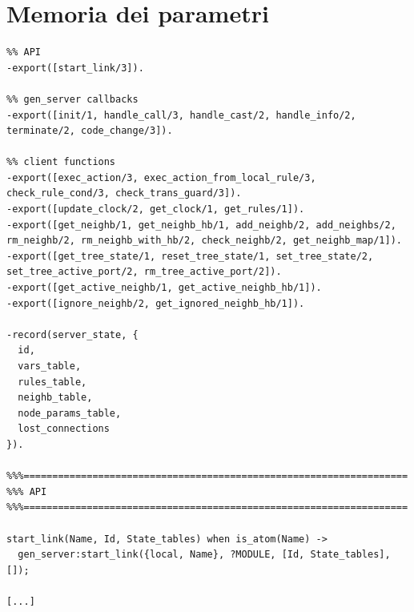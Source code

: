 \documentclass[italian]{memoir}
\begin{document}
\chapter{Memoria dei parametri}\label{code:stateserver}
\begin{verbatim}
%% API
-export([start_link/3]).

%% gen_server callbacks
-export([init/1, handle_call/3, handle_cast/2, handle_info/2, terminate/2, code_change/3]).

%% client functions
-export([exec_action/3, exec_action_from_local_rule/3, check_rule_cond/3, check_trans_guard/3]).
-export([update_clock/2, get_clock/1, get_rules/1]).
-export([get_neighb/1, get_neighb_hb/1, add_neighb/2, add_neighbs/2, rm_neighb/2, rm_neighb_with_hb/2, check_neighb/2, get_neighb_map/1]).
-export([get_tree_state/1, reset_tree_state/1, set_tree_state/2, set_tree_active_port/2, rm_tree_active_port/2]).
-export([get_active_neighb/1, get_active_neighb_hb/1]).
-export([ignore_neighb/2, get_ignored_neighb_hb/1]).

-record(server_state, {
  id,
  vars_table,
  rules_table,
  neighb_table,
  node_params_table,
  lost_connections
}).

%%%===================================================================
%%% API
%%%===================================================================

start_link(Name, Id, State_tables) when is_atom(Name) ->
  gen_server:start_link({local, Name}, ?MODULE, [Id, State_tables], []);

[...]


\end{verbatim}
\end{document}
